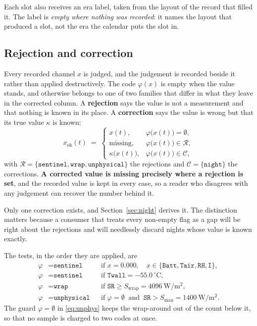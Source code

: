 \documentclass[11pt,a4paper]{article}
\begin{document}
Each slot also receives an era label, taken from the layout of the record that filled it. The label is \emph{empty where nothing was recorded}: it names the layout that produced a slot, not the era the calendar puts the slot in.

\subsection{Rejection and correction}
\label{sec:reject}

Every recorded channel $x$ is judged, and the judgement is recorded beside it rather than applied destructively. The code $\varphi(x)$ is empty when the value stands, and otherwise belongs to one of two families that differ in what they leave in the corrected column. A \textbf{rejection} says the value is not a measurement and that nothing is known in its place. A \textbf{correction} says the value is wrong but that its true value $\kappa$ is known:
\begin{equation}
\label{eq:flag}
x_{\mathrm{ok}}(t) \;=\;
\begin{cases}
x(t), & \varphi\bigl(x(t)\bigr) = \emptyset,\\[2pt]
\text{missing}, & \varphi\bigl(x(t)\bigr) \in \mathcal{R},\\[2pt]
\kappa\bigl(x(t)\bigr), & \varphi\bigl(x(t)\bigr) \in \mathcal{C},
\end{cases}
\end{equation}
with $\mathcal{R} = \{\texttt{sentinel}, \texttt{wrap}, \texttt{unphysical}\}$ the rejections and $\mathcal{C} = \{\texttt{night}\}$ the corrections. \textbf{A corrected value is missing precisely where a rejection is set}, and the recorded value is kept in every case, so a reader who disagrees with any judgement can recover the number behind it.

Only one correction exists, and Section~\ref{sec:night} derives it. The distinction matters because a consumer that treats every non-empty flag as a gap will be right about the rejections and will needlessly discard nights whose value is known exactly.

The tests, in the order they are applied, are
\begin{align}
\varphi &= \texttt{sentinel}
&&\text{if } x = 0.000, \quad x \in \{\texttt{Batt}, \texttt{Tair}, \texttt{RH}, \texttt{I}\},
\label{eq:zero}\\
\varphi &= \texttt{sentinel}
&&\text{if } \texttt{Twall} = -55.0\,^\circ\mathrm{C},
\label{eq:twall}\\
\varphi &= \texttt{wrap}
&&\text{if } \texttt{SR} \geq S_{\mathrm{wrap}} = 4096\ \mathrm{W/m^2},
\label{eq:wrap}\\
\varphi &= \texttt{unphysical}
&&\text{if } \varphi = \emptyset \ \text{ and } \
\texttt{SR} > S_{\max} = 1400\ \mathrm{W/m^2}.
\label{eq:unphys}
\end{align}
The guard $\varphi = \emptyset$ in \eqref{eq:unphys} keeps the wrap-around out of the count below it, so that no sample is charged to two codes at once.
\end{document}
